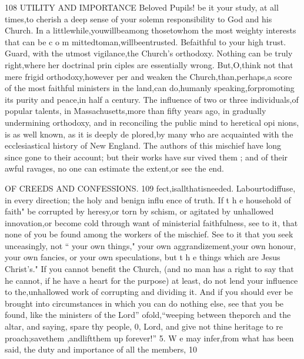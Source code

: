 \documentclass[
]{book}
\begin{document}
108 UTILITY AND IMPORTANCE
Beloved Pupils! be it your study, at all times,to cherish a deep sense of your solemn responsibility to God and his Church. In a littlewhile,youwillbeamong thosetowhom the most weighty interests that can be c o m mittedtoman,willbeentrusted. Befaithful to your high trust. Guard, with the utmost
vigilance,the Church's orthodoxy. Nothing can be truly right,where her doctrinal prin ciples are essentially wrong. But,O,think not that mere frigid orthodoxy,however per
and weaken the Church,than,perhaps,a score of the most faithful ministers in the land,can
do,humanly speaking,forpromoting its purity and peace,in half a century. The influence
of two or three individuals,of popular talents, in Massachusetts,more than fifty years ago,
in gradually undermining orthodoxy, and in
reconciling the public mind to heretical opi
nions, is as well known, as it is deeply de
plored,by many who are acquainted with the
ecclesiastical history of New England. The authors of this mischief have long since gone
to their account; but their works have sur vived them ; and of their awful ravages, no one can estimate the extent,or see the end.

OF CREEDS AND CONFESSIONS. 109
fect,isallthatisneeded. Labourtodiffuse, in every direction; the holy and benign influ ence of truth. If t h e household of faith"
be corrupted by heresy,or torn by schism, or agitated by unhallowed innovation,or become
cold through want of ministerial faithfulness,
see to it, that none of you be found among the workers of the mischief. See to it that
you seek unceasingly, not `` your own things," your own aggrandizement,your own honour,
your own fancies, or your own speculations, but t h e things which are Jesus Christ's." If you cannot benefit the Church, (and no man has a right to say that he cannot, if he have a heart for the purpose) at least, do
not lend your influence to the,unhallowed
work of corrupting and dividing it. And if
you should ever be brought into circumstances
in which you can do nothing else, see that you be found, like the ministers of the
Lord'' ofold,``weeping between theporch and the altar, and saying, spare thy people,
0, Lord, and give not thine heritage to re proach;savethem ,andliftthem up forever!''
5. W e may infer,from what has been said,
the duty and importance of all the members, 10
\end{document}
